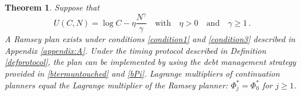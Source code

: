 \documentclass[12pt]{article}
\newtheorem{theorem}{Theorem}%
\begin{document}
\setcounter{theorem}{0}
\begin{theorem}\label{thm1}
Suppose that %
\begin{equation} \label{DNYutil}
	U(C, N)=\log C-\eta \frac{N^\gamma}{\gamma} \quad \text{with} \quad \eta>0  \quad \text{and} \quad \gamma\geq 1\, . 
\end{equation}
A Ramsey plan exists	under  conditions \ref{condition1} and \ref{condition3}  described in Appendix \ref{appendix:A}.  Under the timing protocol described in Definition \ref{defprotocol},
the  plan can be implemented by using the debt management strategy provided in \eqref{btermuntouched} and \eqref{bPi}. {Lagrange multipliers of continuation   planners equal the Lagrange multiplier of the  Ramsey planner:  $\Phi_j^\ast = \Phi_0^\ast$ for $j\geq 1$}.
\end{theorem} 
\end{document}
